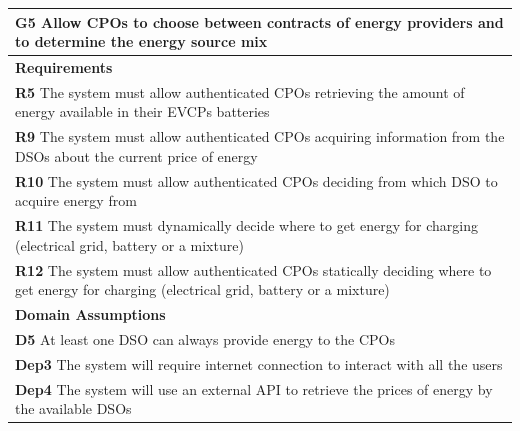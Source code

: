 \begin{table}[H]
    \begin{tabularx}{\textwidth}{X}
        \toprule
        \textbf{G5} Allow CPOs to choose between contracts of energy providers and to determine the energy source mix                                      \\ \midrule
        \textbf{Requirements}                                                                                                                              \\ \midrule
        \textbf{R5}  The system must allow authenticated CPOs retrieving the amount of energy available in their EVCPs batteries                           \\
        \textbf{R9}  The system must allow authenticated CPOs acquiring information from the DSOs about the current price of energy                        \\
        \textbf{R10}  The system must allow authenticated CPOs deciding from which DSO to acquire energy from                                              \\
        \textbf{R11} The system must dynamically decide where to get energy for charging (electrical grid, battery or a mixture)                           \\
        \textbf{R12} The system must allow authenticated CPOs statically deciding where to get energy for charging (electrical grid, battery or a mixture) \\  \midrule
        \textbf{Domain Assumptions}                                                                                                                        \\ \midrule
        \textbf{D5}   At least one DSO can always provide energy to the CPOs                                                                               \\
        \textbf{Dep3} The system will require internet connection to interact with all the users                                                           \\
        \textbf{Dep4} The system will use an external API to retrieve the prices of energy by the available DSOs                                           \\  \bottomrule
    \end{tabularx}
\end{table}
